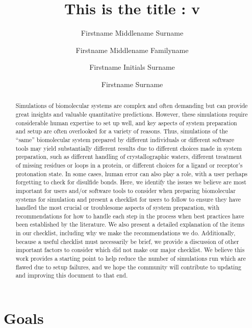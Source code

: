 \documentclass[9pt,bestpractices]{livecoms}
\title{This is the title : v\versionnumber}
\author[1*]{Firstname Middlename Surname}
\author[1,2\authfn{1}\authfn{3}]{Firstname Middlename Familyname}
\author[2\authfn{1}\authfn{4}]{Firstname Initials Surname}
\author[2*]{Firstname Surname}
\affil[1]{Institution 1}
\affil[2]{Institution 2}
\begin{document}
\begin{frontmatter}
\maketitle

\begin{abstract}
Simulations of biomolecular systems are complex and often demanding but can provide great insights and valuable quantitative predictions. 
However, these simulations require considerable human expertise to set up well, and key aspects of system preparation and setup are often overlooked for a variety of reasons.
Thus, simulations of the ``same'' biomolecular system prepared by different individuals or different software tools may yield substantially different results due to different choices made in system preparation, such as different handling of crystallographic waters, different treatment of missing residues or loops in a protein, or different choices for a ligand or receptor's protonation state. 
In some cases, human error can also play a role, with a user perhaps forgetting to check for disulfide bonds. 
Here, we identify the issues we believe are most important for users and/or software tools to consider when preparing biomolecular systems for simulation and present a checklist for users to follow to ensure they have handled the most crucial or troublesome aspects of system preparation, with recommendations for how to handle each step in the process when best practices have been established by the literature.
We also present a detailed explanation of the items in our checklist, including why we make the recommendations we do.
Additionally, because a useful checklist must necessarily be brief, we provide a discussion of other important factors to consider which did not make our major checklist. 
We believe this work provides a starting point to help reduce the number of simulations run which are flawed due to setup failures, and we hope the community will contribute to updating and improving this document to that end.
\end{abstract}

\end{frontmatter}




\section{Goals}
\end{document}
